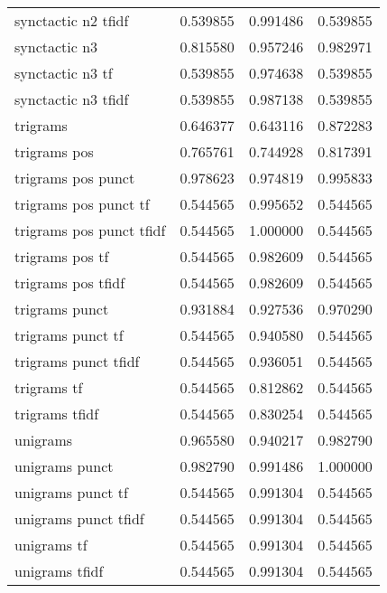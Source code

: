 \begin{tabular}{lrrr}
synctactic n2 tfidf        &  0.539855 &       0.991486 &             0.539855 \\
synctactic n3              &  0.815580 &       0.957246 &             0.982971 \\
synctactic n3 tf           &  0.539855 &       0.974638 &             0.539855 \\
synctactic n3 tfidf        &  0.539855 &       0.987138 &             0.539855 \\
trigrams                   &  0.646377 &       0.643116 &             0.872283 \\
trigrams pos               &  0.765761 &       0.744928 &             0.817391 \\
trigrams pos punct         &  0.978623 &       0.974819 &             0.995833 \\
trigrams pos punct tf      &  0.544565 &       0.995652 &             0.544565 \\
trigrams pos punct tfidf   &  0.544565 &       1.000000 &             0.544565 \\
trigrams pos tf            &  0.544565 &       0.982609 &             0.544565 \\
trigrams pos tfidf         &  0.544565 &       0.982609 &             0.544565 \\
trigrams punct             &  0.931884 &       0.927536 &             0.970290 \\
trigrams punct tf          &  0.544565 &       0.940580 &             0.544565 \\
trigrams punct tfidf       &  0.544565 &       0.936051 &             0.544565 \\
trigrams tf                &  0.544565 &       0.812862 &             0.544565 \\
trigrams tfidf             &  0.544565 &       0.830254 &             0.544565 \\
unigrams                   &  0.965580 &       0.940217 &             0.982790 \\
unigrams punct             &  0.982790 &       0.991486 &             1.000000 \\
unigrams punct tf          &  0.544565 &       0.991304 &             0.544565 \\
unigrams punct tfidf       &  0.544565 &       0.991304 &             0.544565 \\
unigrams tf                &  0.544565 &       0.991304 &             0.544565 \\
unigrams tfidf             &  0.544565 &       0.991304 &             0.544565 \\
\bottomrule
\end{tabular}
